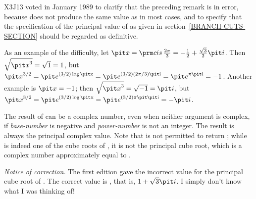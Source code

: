 \begin{defun}[Function]
\begin{new}
X3J13 voted in January 1989
to clarify that the preceding remark is in
error, because  does not produce the same value
as  in most cases, and to specify that the
specification of the principal value of  as given in section~\ref{BRANCH-CUTS-SECTION}
should be regarded as definitive.

As an example of the difficulty, let
\( {\it x}=\cis {2 \pi \over 3}= -{1 \over 2} + {\sqrt{3} \over 2}{\it i} \).
Then \( \sqrt{{\it x}^3} = \sqrt{1} = 1 \), but
\( {\it x}^{3 / 2} = {\it e}^{(3/2) \log {\hbox{\scriptsize\it x}}}
   = {\it e}^{(3/2) (2\pi/3) \hbox{\scriptsize\it i}} = {\it e}^{\pi \hbox{\scriptsize\it i}} = -1 \).
Another example is ${\it x}=-1$; then \( \sqrt{{\it x}^3} = \sqrt{-1} = {\it i} \), but
\( {\it x}^{3/2} = {\it e}^{(3 / 2) \log {\hbox{\scriptsize\it x}}}
   = {\it e}^{(3/2) \pi \hbox{\scriptsize\it \hbox{\scriptsize\it i}}} = -{\it i} \).
\end{new}

The result of  can be a complex number, even when neither argument
is complex, if {\it base-number} is negative and {\it power-number}
is not an integer.  The result is always the principal complex value.
Note that  is not permitted to return ;
while  is indeed one of the cube roots of , it is
not the principal cube root, which is a complex number
approximately equal to .

\begin{new}%
{\it Notice of correction.}  The first edition gave the incorrect value
 for the principal cube root of .  The correct
value is , that is, $1+\sqrt{3}{\it i}$.  I simply don't know what
I was thinking of!
\end{new}
\end{defun}


